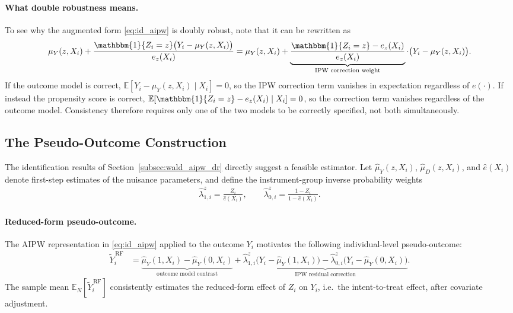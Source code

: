 \documentclass[12pt,a4paper]{article}
\newcommand{\E}{\mathbb{E}}
\newcommand{\En}{\mathbb{E}_N}
\newcommand{\ind}{\mathbbm{1}}
\begin{document}
\paragraph{What double robustness means.}

To see why the augmented form \eqref{eq:id_aipw} is doubly robust, note that it can be
rewritten as
\begin{align}
    \mu_Y(z, X_i)
    +
    \frac{\ind\{Z_i = z\}\bigl(Y_i - \mu_Y(z, X_i)\bigr)}{e_z(X_i)}
    =
    \mu_Y(z, X_i)
    +
    \underbrace{
        \frac{\ind\{Z_i = z\} - e_z(X_i)}{e_z(X_i)}
    }_{\text{IPW correction weight}}
    \cdot
    \bigl(Y_i - \mu_Y(z, X_i)\bigr).
    \label{eq:dr_decomp}
\end{align}
If the outcome model is correct, $\E[Y_i - \mu_Y(z,X_i) \mid X_i] = 0$, so the IPW
correction term vanishes in expectation regardless of $e(\cdot)$. If instead the propensity
score is correct, $\E[\ind\{Z_i=z\} - e_z(X_i) \mid X_i] = 0$, so the correction term
vanishes regardless of the outcome model. Consistency therefore requires only one of the
two models to be correctly specified, not both simultaneously.

\subsection{The Pseudo-Outcome Construction}
\label{subsec:wald_aipw_pseudo}

The identification results of Section~\ref{subsec:wald_aipw_dr} directly suggest a
feasible estimator. Let $\hat{\mu}_Y(z, X_i)$, $\hat{\mu}_D(z, X_i)$, and $\hat{e}(X_i)$
denote first-step estimates of the nuisance parameters, and define the instrument-group
inverse probability weights
\begin{align}
    \hat{\lambda}^z_{1,i} = \frac{Z_i}{\hat{e}(X_i)},
    \qquad
    \hat{\lambda}^z_{0,i} = \frac{1 - Z_i}{1 - \hat{e}(X_i)}.
    \label{eq:lambda_z}
\end{align}

\paragraph{Reduced-form pseudo-outcome.}

The AIPW representation in \eqref{eq:id_aipw} applied to the outcome $Y_i$ motivates
the following individual-level pseudo-outcome:
\begin{align}
    \widetilde{Y}^{\,\mathrm{RF}}_i
    &=
    \underbrace{
        \hat{\mu}_Y(1, X_i) - \hat{\mu}_Y(0, X_i)
    }_{\text{outcome model contrast}}
    +
    \underbrace{
        \hat{\lambda}^z_{1,i}
        \bigl(Y_i - \hat{\mu}_Y(1, X_i)\bigr)
        -
        \hat{\lambda}^z_{0,i}
        \bigl(Y_i - \hat{\mu}_Y(0, X_i)\bigr)
    }_{\text{IPW residual correction}}.
    \label{eq:rf_pseudo}
\end{align}
The sample mean $\En[\widetilde{Y}^{\,\mathrm{RF}}_i]$ consistently estimates the
reduced-form effect of $Z_i$ on $Y_i$, i.e.\ the intent-to-treat effect, after covariate
adjustment.
\end{document}
